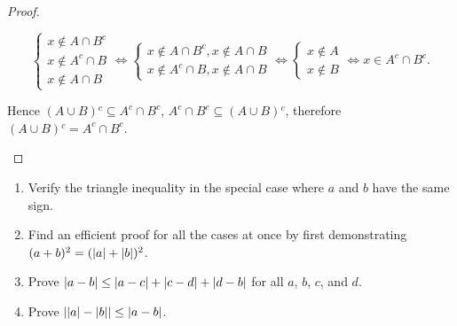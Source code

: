 \documentclass[class=understanding-analysis,crop=false]{standalone}
\begin{document}
\begin{proof}
\begin{enumerate}[label = (\alph*)]
\[                  \begin{cases}
                      x\notin A\cap B^{c} \\
                      x\notin A^{c}\cap B \\
                      x\notin A\cap B
                  \end{cases}
                  \Leftrightarrow
                  \begin{cases}
                      x\notin A\cap B^{c}, x\notin A\cap B \\
                      x\notin A^{c}\cap B, x\notin A\cap B
                  \end{cases}
                  \Leftrightarrow
                  \begin{cases}
                      x\notin A \\
                      x\notin B
                  \end{cases}
                  \Leftrightarrow
                  x\in A^{c}\cap B^{c}.
              \]
              \par Hence $(A\cup B){}^{c}\subseteq A^{c}\cap B^{c}$, $A^{c}\cap B^{c}\subseteq (A\cup B){}^{c}$, therefore $(A\cup B){}^{c} = A^{c}\cap B^{c}$.
    \end{enumerate}
\end{proof}

\begin{exercise}
    \begin{enumerate}[label = (\alph*)]
        \item Verify the triangle inequality in the special case where $a$ and $b$ have the same sign.
        \item Find an efficient proof for all the cases at once by first demonstrating $(a + b){}^{2} = (\left\vert{a}\right\vert + \left\vert{b}\right\vert){}^{2}$.
        \item Prove $\left\vert{a - b}\right\vert\le \left\vert{a-c}\right\vert + \left\vert{c-d}\right\vert + \left\vert{d-b}\right\vert$ for all $a$, $b$, $c$, and $d$.
        \item Prove $\left\vert{\left\vert{a}\right\vert - \left\vert{b}\right\vert}\right\vert\le \left\vert{a-b}\right\vert$.
    \end{enumerate}
\end{exercise}
\end{document}
